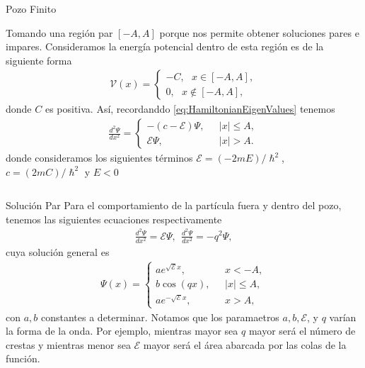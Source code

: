 \documentclass[aspectratio=1610]{beamer}
\begin{document}
\begin{frame}{Pozo Finito}
   
Tomando una región par $[-A , A]$ porque nos permite obtener soluciones pares e impares. Consideramos la energía potencial dentro de esta región es de la siguiente forma  
\begin{align}
        \mathcal{V}(x) = 
        \left\{ \begin{array}{ll}
        -C, \:\:\:  x \in [-A,A],
        \\
        0, \:\:\: x \notin [-A,A],
        \end{array}
        \right.
        \label{eq:PotencialFinito}
\end{align}
donde $C$ es positiva. Así, recordanddo \eqref{eq:HamiltonianEigenValues} tenemos
\begin{align}
        \frac{d^2\Psi}{dx^2}= 
        \left\{ \begin{array}{ll}
        -(c-\mathcal{E})\Psi,& \:\:\:  |x| \leq A,
        \\
        \mathcal{E}\Psi,& \:\:\: |x| > A.
        \end{array}
        \right.
        \label{eq:SCsimple}
\end{align}
donde consideramos los siguientes términos $\mathcal{E} = (-2mE)/\hslash^2$, \\ $c = (2mC)/\hslash^2$ y $ E<0$
    
\begin{columns}
\column{37em}
\end{columns}
\end{frame}



\begin{frame}{Solución Par}
Para el comportamiento de la partícula fuera y dentro del pozo, tenemos las siguientes ecuaciones respectivamente
 \begin{align*}
     \frac{d^2\Psi}{dx^2} = \mathcal{E}\Psi, \:\:      \frac{d^2\Psi}{dx^2} = -q^2\Psi,
 \end{align*}
cuya solución general es 
\begin{align}
        \Psi(x) = 
        \left\{ \begin{array}{ll}
        ae^{\sqrt{\mathcal{E}}x},& \:\:\:  x < -A,
        \\
        b\cos(qx), & \:\:\: |x| \leq A,
        \\
        ae^{-\sqrt{\mathcal{E}}x},& \:\:\: x > A,
        \end{array}
        \right.
        \label{eq:Solpar}
\end{align}
con $a, b$ constantes a determinar. Notamos que los paramaetros
$a,b,\mathcal{E}$, y $q$ varían la forma de la onda. Por ejemplo, mientras mayor sea $q$ mayor será el número de crestas y mientras menor sea $\mathcal{E}$ mayor será el área abarcada por las colas de la función.
    
\begin{columns}
\column{37em}
\end{columns}
\end{frame}
\end{document}
